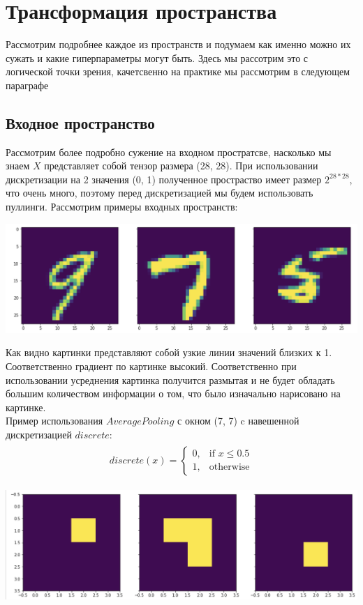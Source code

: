 \section{Трансформация пространства}
Рассмотрим подробнее каждое из пространств и подумаем как именно можно их сужать и какие гиперпараметры могут быть. Здесь мы рассотрим это с логической точки зрения, качетсвенно на практике мы рассмотрим в следующем параграфе
\subsection{Входное пространство}
Рассмотрим более подробно сужение на входном простратсве, насколько мы знаем $X$ представляет собой тензор размера (28, 28). При использовании дискретизации на 2 значения (0, 1) полученное простраство имеет размер $2^{28 * 28}$, что очень много, поэтому перед дискретизацией мы будем использовать пуллинги. Рассмотрим примеры входных пространств:
\begin{center}
    \includegraphics[scale=0.5]{images/plt_input.png}
\end{center}
Как видно картинки представляют собой узкие линии значений близких к 1. Соответственно градиент по картинке высокий. Соответственно при использовании усреднения картинка получится размытая и не будет обладать большим количеством информации о том, что было изначально нарисовано на картинке. \\
Пример использования $Average Pooling$ с окном (7, 7) c навешенной дискретизацией  $discrete$:
\begin{gather}
\begin{aligned}  
discrete(x) = 
\begin{cases}
    0, & \text{if } x\leqslant 0.5\\
    1,              & \text{otherwise}
\end{cases}
\end{aligned}
\end{gather}
\begin{center}
    \includegraphics[scale=0.5]{images/plt_arg_7.png}
\end{center}
